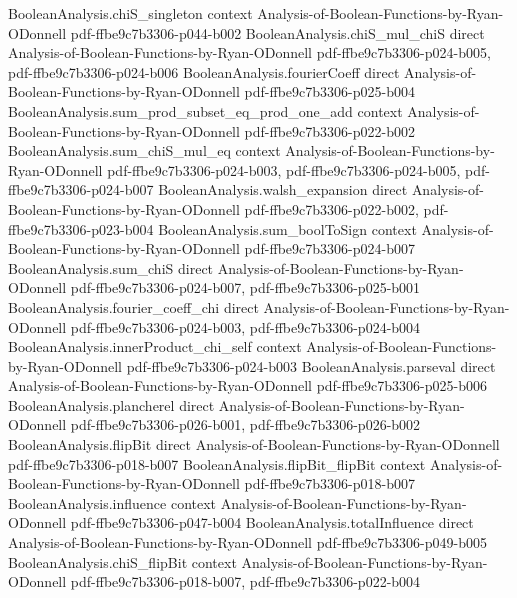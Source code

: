 \begin{lemma}
\proofstep
  {BooleanAnalysis.chiS_singleton}
  {context}
  {Analysis-of-Boolean-Functions-by-Ryan-ODonnell}
  {pdf-ffbe9c7b3306-p044-b002}
\proofstep
  {BooleanAnalysis.chiS_mul_chiS}
  {direct}
  {Analysis-of-Boolean-Functions-by-Ryan-ODonnell}
  {pdf-ffbe9c7b3306-p024-b005,
    pdf-ffbe9c7b3306-p024-b006}
\proofstep
  {BooleanAnalysis.fourierCoeff}
  {direct}
  {Analysis-of-Boolean-Functions-by-Ryan-ODonnell}
  {pdf-ffbe9c7b3306-p025-b004}
\proofstep
  {BooleanAnalysis.sum_prod_subset_eq_prod_one_add}
  {context}
  {Analysis-of-Boolean-Functions-by-Ryan-ODonnell}
  {pdf-ffbe9c7b3306-p022-b002}
\proofstep
  {BooleanAnalysis.sum_chiS_mul_eq}
  {context}
  {Analysis-of-Boolean-Functions-by-Ryan-ODonnell}
  {pdf-ffbe9c7b3306-p024-b003,
    pdf-ffbe9c7b3306-p024-b005,
    pdf-ffbe9c7b3306-p024-b007}
\proofstep
  {BooleanAnalysis.walsh_expansion}
  {direct}
  {Analysis-of-Boolean-Functions-by-Ryan-ODonnell}
  {pdf-ffbe9c7b3306-p022-b002,
    pdf-ffbe9c7b3306-p023-b004}
\proofstep
  {BooleanAnalysis.sum_boolToSign}
  {context}
  {Analysis-of-Boolean-Functions-by-Ryan-ODonnell}
  {pdf-ffbe9c7b3306-p024-b007}
\proofstep
  {BooleanAnalysis.sum_chiS}
  {direct}
  {Analysis-of-Boolean-Functions-by-Ryan-ODonnell}
  {pdf-ffbe9c7b3306-p024-b007,
    pdf-ffbe9c7b3306-p025-b001}
\proofstep
  {BooleanAnalysis.fourier_coeff_chi}
  {direct}
  {Analysis-of-Boolean-Functions-by-Ryan-ODonnell}
  {pdf-ffbe9c7b3306-p024-b003,
    pdf-ffbe9c7b3306-p024-b004}
\proofstep
  {BooleanAnalysis.innerProduct_chi_self}
  {context}
  {Analysis-of-Boolean-Functions-by-Ryan-ODonnell}
  {pdf-ffbe9c7b3306-p024-b003}
\proofstep
  {BooleanAnalysis.parseval}
  {direct}
  {Analysis-of-Boolean-Functions-by-Ryan-ODonnell}
  {pdf-ffbe9c7b3306-p025-b006}
\proofstep
  {BooleanAnalysis.plancherel}
  {direct}
  {Analysis-of-Boolean-Functions-by-Ryan-ODonnell}
  {pdf-ffbe9c7b3306-p026-b001,
    pdf-ffbe9c7b3306-p026-b002}
\proofstep
  {BooleanAnalysis.flipBit}
  {direct}
  {Analysis-of-Boolean-Functions-by-Ryan-ODonnell}
  {pdf-ffbe9c7b3306-p018-b007}
\proofstep
  {BooleanAnalysis.flipBit_flipBit}
  {context}
  {Analysis-of-Boolean-Functions-by-Ryan-ODonnell}
  {pdf-ffbe9c7b3306-p018-b007}
\proofstep
  {BooleanAnalysis.influence}
  {context}
  {Analysis-of-Boolean-Functions-by-Ryan-ODonnell}
  {pdf-ffbe9c7b3306-p047-b004}
\proofstep
  {BooleanAnalysis.totalInfluence}
  {direct}
  {Analysis-of-Boolean-Functions-by-Ryan-ODonnell}
  {pdf-ffbe9c7b3306-p049-b005}
\proofstep
  {BooleanAnalysis.chiS_flipBit}
  {context}
  {Analysis-of-Boolean-Functions-by-Ryan-ODonnell}
  {pdf-ffbe9c7b3306-p018-b007,
    pdf-ffbe9c7b3306-p022-b004}

\end{lemma}
